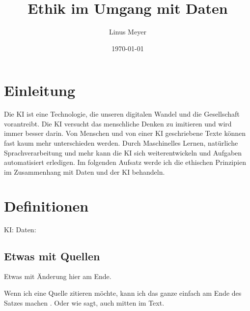 \documentclass{report}
\title{Ethik im Umgang mit Daten}
\author{Linus Meyer}
\date{\today}
\begin{document}
\maketitle



\tableofcontents

\chapter{Einleitung}

Die KI ist eine Technologie, die unseren digitalen Wandel und die Gesellschaft vorantreibt. 
Die KI versucht das menschliche Denken zu imitieren und wird immer besser darin. Von Menschen und von einer KI geschriebene Texte können fast kaum mehr unterschieden werden. 
Durch Maschinelles Lernen, natürliche  Sprachverarbeitung und mehr kann die KI sich weiterentwickeln und Aufgaben automatisiert erledigen.
Im folgenden Aufsatz werde ich die ethischen Prinzipien im Zusammenhang mit Daten und der KI behandeln.

\newpage

\chapter{Definitionen}

KI:
Daten:

\newpage
\section{Etwas mit Quellen}

Etwas mit Änderung hier am Ende.

Wenn ich eine Quelle zitieren möchte, kann ich das ganze einfach am Ende des Satzes machen \citep{example}. Oder wie \citet{example} sagt, auch mitten im Text.

\printbibliography
\end{document}
